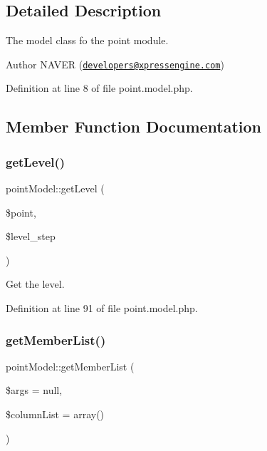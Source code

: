 \subsection{Detailed Description}
The model class fo the point module. 

\begin{DoxyAuthor}{Author}
N\+A\+V\+ER (\href{mailto:developers@xpressengine.com}{\tt developers@xpressengine.\+com}) 
\end{DoxyAuthor}


Definition at line 8 of file point.\+model.\+php.



\subsection{Member Function Documentation}
\hypertarget{classpointModel_aaada8e8cba6e965f06c2b25e4974537c}{}\label{classpointModel_aaada8e8cba6e965f06c2b25e4974537c} 
\subsubsection{\texorpdfstring{get\+Level()}{getLevel()}}
{\footnotesize\ttfamily point\+Model\+::get\+Level (\begin{DoxyParamCaption}\item[{}]{\$point,  }\item[{}]{\$level\+\_\+step }\end{DoxyParamCaption})}



Get the level. 



Definition at line 91 of file point.\+model.\+php.

\hypertarget{classpointModel_ab3b968a740e10f9039da99adae67dcb7}{}\label{classpointModel_ab3b968a740e10f9039da99adae67dcb7} 
\subsubsection{\texorpdfstring{get\+Member\+List()}{getMemberList()}}
{\footnotesize\ttfamily point\+Model\+::get\+Member\+List (\begin{DoxyParamCaption}\item[{}]{\$args = {\ttfamily null},  }\item[{}]{\$column\+List = {\ttfamily array()} }\end{DoxyParamCaption})}



